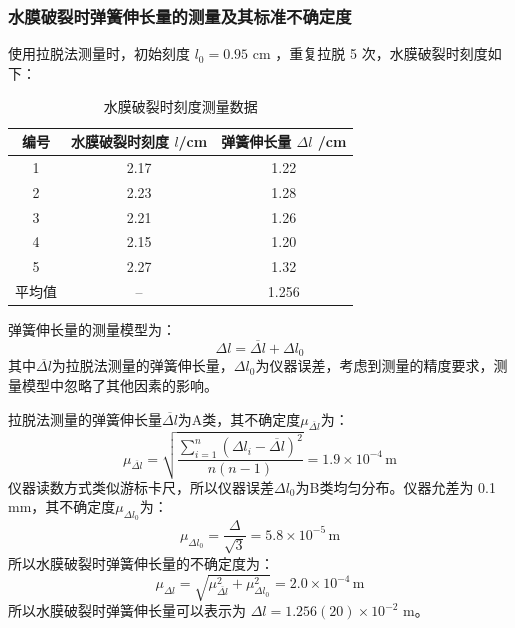 \documentclass[a4paper]{extarticle}
\begin{document}
    \subsubsection{水膜破裂时弹簧伸长量的测量及其标准不确定度}
    \hspace{2em}
    使用拉脱法测量时，初始刻度 $l_0 = 0.95$ cm ，重复拉脱 5 次，水膜破裂时刻度如下：
    \begin{table}[H]
        \centering
        \caption{水膜破裂时刻度测量数据}
        \begin{tabular}{ccc}
            \toprule
            编号 & 水膜破裂时刻度 $l$/cm & 弹簧伸长量 $\Delta l$ /cm\\
            \midrule
            1 & 2.17 & 1.22\\
            2 & 2.23 & 1.28\\
            3 & 2.21 & 1.26\\
            4 & 2.15 & 1.20\\
            5 & 2.27 & 1.32\\
            \midrule
            平均值 & -- & 1.256\\
            \bottomrule
        \end{tabular}
    \end{table}
    \hspace{2em}
    弹簧伸长量的测量模型为：
    \begin{equation}
        \Delta l=\overline{\Delta l}+\Delta l_0
        \label{eq:dl}
    \end{equation}
    其中$\overline{\Delta l}$为拉脱法测量的弹簧伸长量，$\Delta l_0$为仪器误差，考虑到测量的精度要求，测量模型中忽略了其他因素的影响。
    \par\hspace{2em}
    拉脱法测量的弹簧伸长量$\overline{\Delta l}$为A类，其不确定度$\mu_{\overline{\Delta l}}$为：
    \begin{equation*}
        \mu_{\overline{\Delta l}}=\sqrt{\frac{\sum\limits_{i=1}^{n}(\Delta l_i-\overline{\Delta l})^2}{n(n-1)}}=1.9\times10^{-4}\,\text{m}
    \end{equation*}
    \hspace{2em}
    仪器读数方式类似游标卡尺，所以仪器误差$\Delta l_0$为B类均匀分布。仪器允差为 0.1 mm，其不确定度$\mu_{\Delta l_0}$为：
    \begin{equation*}
        \mu_{\Delta l_0}=\frac{\Delta}{\sqrt{3}}=5.8\times10^{-5}\,\text{m}
    \end{equation*}
    \hspace{2em}
    所以水膜破裂时弹簧伸长量的不确定度为：
    \begin{equation*}
        \mu_{\Delta l}=\sqrt{\mu_{\overline{\Delta l}}^2+\mu_{\Delta l_0}^2}=2.0\times10^{-4}\,\text{m}
    \end{equation*}
    所以水膜破裂时弹簧伸长量可以表示为 $\Delta l=1.256(20)\times10^{-2}$ m。
\end{document}
